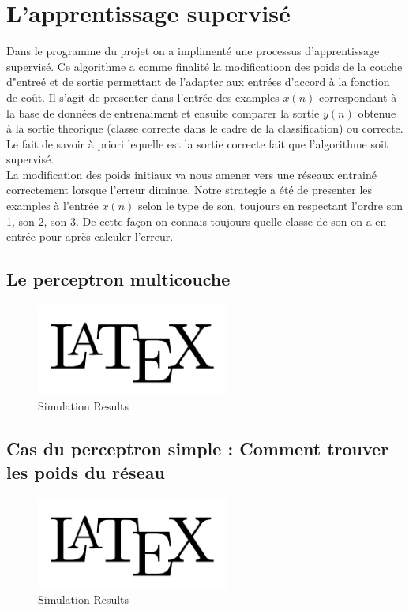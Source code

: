 \documentclass[journal]{IEEEtran}
\begin{document}
\section{L’apprentissage supervisé}
Dans le programme du projet on a implimenté une processus d'apprentissage supervisé. Ce algorithme a 
comme finalité la modificatioon des poids de la couche d"entreé et de sortie permettant de l'adapter aux 
entrées d'accord à la fonction de coût.
Il s'agit de presenter dans l'entrée des examples $x(n)$ correspondant à la base de données de entrenaiment et 
ensuite comparer la sortie $ y(n) $ obtenue à la sortie theorique (classe correcte dans le cadre de la classification) ou correcte. Le fait de savoir à priori lequelle est la sortie correcte fait que l'algorithme
soit supervisé.\\
La modification des poids initiaux  va nous amener vers une réseaux entrainé correctement lorsque l'erreur 
diminue.
Notre strategie a été de presenter les examples à l'entrée  $x(n)$ selon le type de son, toujours en respectant l'ordre son 1, son 2, son 3. De cette façon on connais toujours quelle classe de son on a en
entrée pour après calculer l'erreur.






\subsection{Le perceptron multicouche}\blindtext

\begin{figure}[h]
	\centering
	\includegraphics[width=2.5in]{logo}
	\caption{Simulation Results}
	\label{fig_sim}
\end{figure}

\subsection{Cas du perceptron simple : Comment trouver les poids du réseau}\blindtext

\begin{figure}[h]
	\centering
	\includegraphics[width=2.5in]{logo}
	\caption{Simulation Results}
	\label{fig_sim}
\end{figure}
\end{document}
